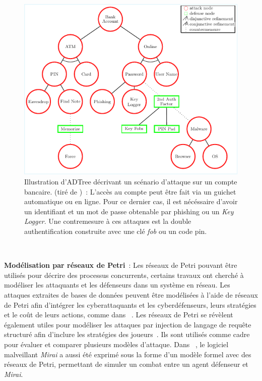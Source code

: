 \begin{figure}[h!]
    \centering
    \includegraphics[width=\linewidth]{figures/adt.pdf}
    \caption[Illustration d'ADTree d'un scénario d'attaque sur un compte bancaire.]{Illustration d'ADTree décrivant un scénario d'attaque sur un compte bancaire. (tiré de \cite{BKordy2010})~: L'accès au compte peut être fait via un guichet automatique ou en ligne. Pour ce dernier cas, il est nécéssaire d'avoir un identifiant et un mot de passe obtenable par phishing ou un \textit{Key Logger}. Une contremesure à ces attaques est la double authentification construite avec une clé \textit{fob} ou un code pin.}
    \label{fig:bank_attack_defense_tree}
\end{figure}

\

\noindent
\textbf{Modélisation par réseaux de Petri}~: \quad Les réseaux de Petri pouvant être utilisés pour décrire des processus concurrents, certains travaux ont cherché à modéliser les attaquants et les défenseurs dans un système en réseau.
Les attaques extraites de bases de données peuvent être modélisées à l'aide de réseaux de Petri afin d'intégrer les cyberattaquants et les cyberdéfenseurs, leurs stratégies et le coût de leurs actions, comme dans ~\cite{MPetty2022}. Les réseaux de Petri se révèlent également utiles pour modéliser les attaques par injection de langage de requête structuré afin d'inclure les stratégies des joueurs~\cite{JBland2020}.
Ils sont utilisés comme cadre pour évaluer et comparer plusieurs modèles d'attaque.
Dans ~\cite{SYamaguchi2020}, le logiciel malveillant \textit{Mirai} a aussi été exprimé sous la forme d'un modèle formel avec des réseaux de Petri, permettant de simuler un combat entre un agent défenseur et \textit{Mirai}.

